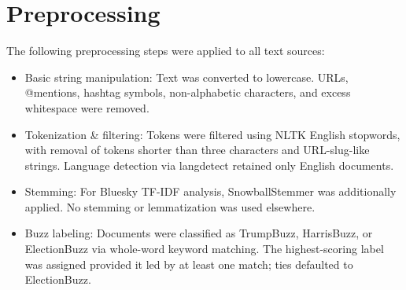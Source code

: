 \section{Preprocessing}

The following preprocessing steps were applied to all text sources:
\begin{itemize}
	\item Basic string manipulation: Text was converted to lowercase. URLs, @mentions, hashtag symbols, non-alphabetic characters, and excess whitespace were removed.
	\item Tokenization \& filtering: Tokens were filtered using NLTK English stopwords, with removal of tokens shorter than three characters and URL-slug-like strings. Language detection via langdetect retained only English documents.
	\item Stemming: For Bluesky TF-IDF analysis, SnowballStemmer was additionally applied. No stemming or lemmatization was used elsewhere.
	\item Buzz labeling: Documents were classified as TrumpBuzz, HarrisBuzz, or ElectionBuzz via whole-word keyword matching. The highest-scoring label was assigned provided it led by at least one match; ties defaulted to ElectionBuzz.
\end{itemize}